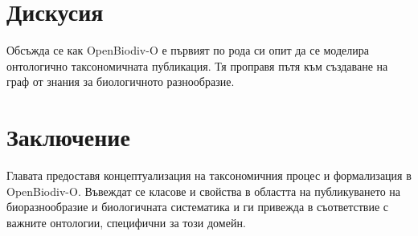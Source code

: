 \section{Дискусия}

Обсъжда се как OpenBiodiv-O е първият по рода си опит да се моделира онтологично таксономичната публикация. Тя проправя пътя към създаване на граф от знания за биологичното разнообразие.

\section{Заключение}

Главата предоставя концептуализация на таксономичния процес и формализация в OpenBiodiv-O. Въвеждат се класове и свойства в областта на публикуването на биоразнообразие и биологичната систематика и ги привежда в съответствие с важните онтологии, специфични за този домейн.